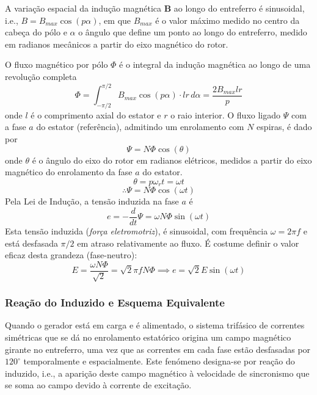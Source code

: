 \clearpage
\noindent A variação espacial da indução magnética $\mathbf{B}$ ao longo do entreferro é sinusoidal, i.e., $B = B_{max}\cos(p\alpha)$, em que $B_{max}$ é o valor máximo medido no centro da cabeça do pólo e $\alpha$ o ângulo que define um ponto ao longo do entreferro, medido em radianos mecânicos a partir do eixo magnético do rotor.

O fluxo magnético por pólo $\Phi$ é o integral da indução magnética ao longo de uma revolução completa
$$
    \Phi = \int_{-\pi/2}^{\pi/2} B_{max}\cos(p\alpha) \cdot lr \,d\alpha = \frac{2B_{max}lr}{p}
$$
onde $l$ é o comprimento axial do estator e $r$ o raio interior. O fluxo ligado $\Psi$ com a fase $a$ do estator (referência), admitindo um enrolamento com $N$ espiras, é dado por
$$
    \Psi = N\Phi\cos(\theta)
$$
onde $\theta$ é o ângulo do eixo do rotor em radianos elétricos, medidos a partir do eixo magnético do enrolamento da fase $a$ do estator.
$$
    \theta = p\omega_r t = \omega t
$$
$$
    \therefore \Psi = N\Phi\cos(\omega t)
$$
Pela Lei de Indução, a tensão induzida na fase $a$ é 
$$
    e = -\frac{d}{dt} \Psi = \omega N \Phi \sin(\omega t)
$$
Esta tensão induzida (\textit{força eletromotriz}), é sinusoidal, com frequência $\omega = 2\pi f$ e está desfasada $\pi/2$ em atraso relativamente ao fluxo. É costume definir o valor eficaz desta grandeza (fase-neutro):
$$
    \boxed{ E = \frac{\omega N \Phi}{\sqrt{2}} = \sqrt{2} \pi fN \Phi }
    \implies 
    e = \sqrt{2} E \sin(\omega t)
$$

\subsubsection{Reação do Induzido e Esquema Equivalente}

Quando o gerador está em carga e é alimentado, o sistema trifásico de correntes simétricas que se dá no enrolamento estatórico origina um campo magnético girante no entreferro, uma vez que as correntes em cada fase estão desfasadas por $120^{\circ}$ temporalmente e espacialmente. Este fenómeno designa-se por reação do induzido, i.e., a aparição deste campo magnético à velocidade de sincronismo que se soma ao campo devido à corrente de excitação.

